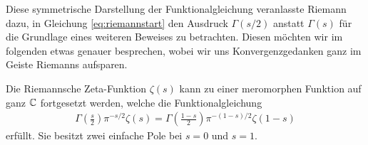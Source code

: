 	Diese symmetrische Darstellung der Funktionalgleichung veranlasste Riemann dazu, in Gleichung \eqref{eq:riemannstart} den Ausdruck $\Gamma(s/2)$ anstatt $\Gamma(s)$ für die Grundlage eines weiteren Beweises zu betrachten.
	Diesen möchten wir im folgenden etwas genauer besprechen, wobei wir uns Konvergenzgedanken ganz im Geiste Riemanns aufsparen.
	\begin{satz}\label{satz:einleitung:riemann}
		Die Riemannsche Zeta-Funktion $\zeta(s)$  kann zu einer meromorphen Funktion auf ganz $\mathbb{C}$ fortgesetzt werden, welche die Funktionalgleichung
		\begin{align*}
			\Gamma\left(\frac{s}{2}\right)\pi^{-s/2}\zeta(s) = \Gamma\left(\frac{1-s}{2}\right)\pi^{-(1-s)/2}\zeta(1-s)
		\end{align*}
		erfüllt. Sie besitzt zwei einfache Pole bei $s=0$ und $s=1$.
	\end{satz}
